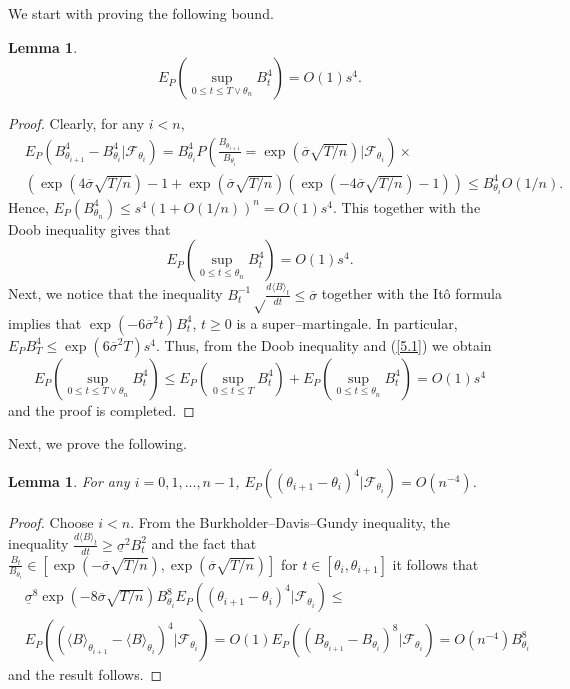 \documentclass{amsart}
\newtheorem{lem}[thm]{Lemma}
\numberwithin{equation}{section}
\begin{document}
We start with proving the following bound.
\begin{lem}\label{moments}
\[E_P\left(\sup_{0\leq t\leq T\vee\theta_n}B^4_t\right)=O(1)s^4.\]
\end{lem}
\begin{proof}
Clearly, for any $i<n$,
\begin{eqnarray*}
&E_P(B^4_{\theta_{i+1}}-B^4_{\theta_{i}}|\mathcal F_{\theta_i})= B^4_{\theta_{i}}
P\left(\frac{B_{\theta_{i+1}}}{B_{\theta_{i}}}=\exp(\overline{\sigma}\sqrt {T/n})|\mathcal F_{\theta_{i}}\right)\times\\
&\left(\exp(4\overline{\sigma}\sqrt{T/n})-1+\exp(\overline{\sigma}\sqrt{T/n})
(\exp(-4\overline{\sigma}\sqrt{T/n})-1)\right)\leq B^4_{\theta_{i}} O(1/n).
\end{eqnarray*}
Hence, $E_P(B^4_{\theta_{n}})\leq s^4(1+O(1/n))^n= O(1)s^4$. This together with
the Doob inequality gives that
\begin{equation}\label{5.1}
E_P\left(\sup_{0\leq t\leq \theta_n}B^4_t\right)=O(1)s^4.
\end{equation}
Next, we notice that the inequality $B^{-1}_t\sqrt\frac{d\langle B\rangle _t}{dt}\leq\overline\sigma$
together with the
It\^{o} formula implies
that
$\exp(-6\overline\sigma^2 t)B^4_t$, $t\geq 0$ is a super--martingale. In particular,
$E_P B^4_T\leq \exp(6\overline\sigma^2 T)s^4$. Thus, from the
Doob inequality and (\ref{5.1}) we obtain
\[E_P\left(\sup_{0\leq t\leq T\vee\theta_n}B^4_t\right)\leq
E_P\left(\sup_{0\leq t\leq T}B^4_t\right)+E_P\left(\sup_{0\leq t\leq \theta_n}B^4_t\right)=
O(1)s^4\]
and the proof is completed.
\end{proof}
Next, we prove the following.
\begin{lem}\label{lem5.2}
For any $i=0,1,...,n-1$, $E_P((\theta_{i+1}-\theta_i)^4|\mathcal F_{\theta_i})=O(n^{-4})$.
\end{lem}
\begin{proof}
Choose $i<n$. From the Burkholder--Davis--Gundy inequality,
the inequality  $\frac{d\langle B\rangle_t}{dt}\geq\underline\sigma^2 B^2_t$
and the fact that
$\frac{B_t}{B_{\theta_i}}\in [\exp(-\overline\sigma\sqrt{T/n}),\exp(\overline\sigma\sqrt{T/n})]$ for
$t\in [\theta_i,\theta_{i+1}]$
it follows that
\begin{eqnarray*}
&\underline\sigma^8\exp(-8\overline\sigma\sqrt{T/n})B^8_{\theta_i}E_P((\theta_{i+1}-\theta_i)^4|\mathcal F_{\theta_i})\leq\\
& E_P \left((\langle B\rangle_{\theta_{i+1}}-\langle B\rangle_{\theta_{i}})^4|\mathcal F_{\theta_i}\right)=O(1)
 E_P((B_{\theta_{i+1}}- B_{\theta_i})^8|\mathcal F_{\theta_i})=O(n^{-4}) B^8_{\theta_i}
\end{eqnarray*}
and the result follows.
\end{proof}
\end{document}
